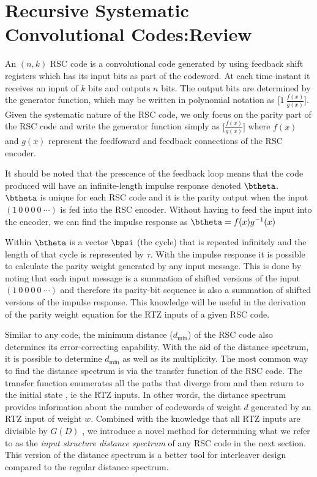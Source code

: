 \section{Recursive Systematic Convolutional Codes:Review}
\label{sec2}

An $(n,k)$ RSC code is a convolutional code generated by using feedback shift registers which has its input bits as part of the codeword. At each time instant it receives an input of $k$ bits and outputs $n$ bits. The output bits are determined by the generator function, which may be written in polynomial notation as  $\Big[1 ~\frac{f(x)}{g(x)}\Big]$. Given the systematic nature of the RSC code, we only focus on the parity part of the RSC code and write the generator function simply as $\Big[\frac{f(x)}{g(x)}\Big]$ where $f(x)$ and $g(x)$ represent the feedfoward and feedback connections of the RSC encoder.  

It should be noted that the prescence of the feedback loop means that the code produced will have an infinite-length impulse response denoted $\btheta$. $\btheta$ is unique for each RSC code and it is the parity output when the input $(1~0~0~0~0~\cdots)$ is fed into the RSC encoder. Without having to feed the input into the encoder, we can find the impulse response as $\btheta=f(x)g^{-1}(x)$

  Within $\btheta$ is a vector $\bpsi$ (the cycle) that is repeated infinitely and the length of that cycle is represented by $\tau$.
 With the impulse response it is possible to calculate the parity weight generated by any input message. This is done by noting that each input message is a summation of shifted versions of the input $(1~0~0~0~0~\cdots)$ and therefore its parity-bit sequence is also a summation of shifted versions of the impulse response. This knowledge will be useful in the derivation of the parity weight equation for the RTZ inputs of a given RSC code.

Similar to any code, the minimum distance ($d_{\text{min}}$) of the RSC code also determines its error-correcting capability. With the aid of the distance spectrum, it is possible to determine $d_{\text{min}}$ as well as its multiplicity. The most common way to find the distance spectrum is via the transfer function of the RSC code. The transfer function enumerates all the paths that diverge from and then return to the initial state \cite{ref3}, ie the RTZ inputs. In other words, the distance spectrum provides information about the number of codewords of weight $d$ generated by an RTZ input of weight $w$. Combined with the knowledge that all RTZ inputs are divisible by $G(D)$ \cite{ref6}, we introduce a novel method for determining what we refer to as the  \textit{input structure distance spectrum} of any RSC code in the next section. This version of the distance spectrum is a better tool for interleaver design compared to the regular distance spectrum.

